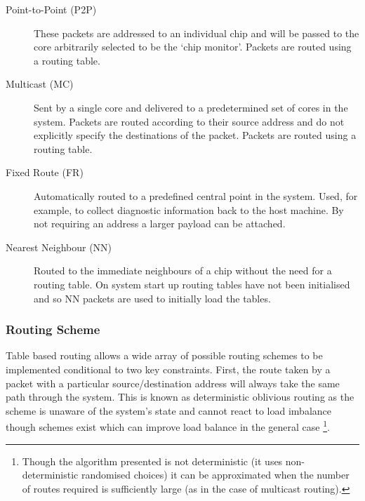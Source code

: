 			\begin{description}
				
				\item[Point-to-Point (P2P)] These packets are addressed to an individual
				chip and will be passed to the core arbitrarily selected to be the `chip
				monitor'. Packets are routed using a routing table.
				
				\item[Multicast (MC)] Sent by a single core and delivered to a
				predetermined set of cores in the system. Packets are routed according
				to their source address and do not explicitly specify the destinations
				of the packet. Packets are routed using a routing table.
				
				\item[Fixed Route (FR)] Automatically routed to a predefined central
				point in the system. Used, for example, to collect diagnostic
				information back to the host machine. By not requiring an address a
				larger payload can be attached.
				
				\item[Nearest Neighbour (NN)] Routed to the immediate neighbours of a
				chip without the need for a routing table. On system start up routing
				tables have not been initialised and so NN packets are used to initially
				load the tables.
				
			\end{description}
			
			\subsubsection{Routing Scheme}
				
				
				Table based routing allows a wide array of possible routing schemes to
				be implemented conditional to two key constraints. First, the route
				taken by a packet with a particular source/destination address will
				always take the same path through the system. This is known as
				deterministic oblivious routing as the scheme is unaware of the system's
				state and cannot react to load imbalance though schemes exist which can
				improve load balance in the general case \cite{singh02}\footnote{Though
				the algorithm presented is not deterministic (it uses non-deterministic
				randomised choices) it can be approximated when the number of routes
				required is sufficiently large (as in the case of multicast routing).}.
				
